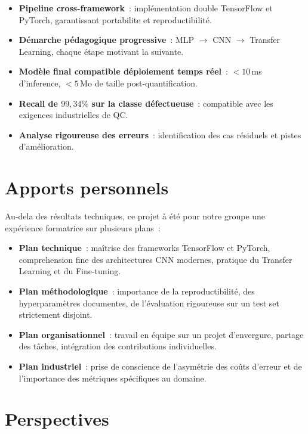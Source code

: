 \documentclass[12pt,a4paper,openany]{report}
\begin{document}
\begin{infobox}[title=Apports du projet]
\begin{itemize}
    \item \textbf{Pipeline cross-framework}~: implémentation double TensorFlow et PyTorch, garantissant portabilite et reproductibilité.
    \item \textbf{Démarche pédagogique progressive}~: MLP $\to$ CNN $\to$ Transfer Learning, chaque étape motivant la suivante.
    \item \textbf{Modèle final compatible déploiement temps réel}~: $<10$\,ms d'inference, $<5$\,Mo de taille post-quantification.
    \item \textbf{Recall de $99{,}34\%$ sur la classe défectueuse}~: compatible avec les exigences industrielles de QC.
    \item \textbf{Analyse rigoureuse des erreurs}~: identification des cas résiduels et pistes d'amélioration.
\end{itemize}
\end{infobox}

\section{Apports personnels}

Au-dela des résultats techniques, ce projet à été pour notre groupe une expérience formatrice sur plusieurs plans~:

\begin{itemize}
    \item \textbf{Plan technique}~: maîtrise des frameworks TensorFlow et PyTorch, comprehension fine des architectures CNN modernes, pratique du Transfer Learning et du Fine-tuning.
    \item \textbf{Plan méthodologique}~: importance de la reproductibilité, des hyperparamètres documentes, de l'évaluation rigoureuse sur un test set strictement disjoint.
    \item \textbf{Plan organisationnel}~: travail en équipe sur un projet d'envergure, partage des tâches, intégration des contributions individuelles.
    \item \textbf{Plan industriel}~: prise de conscience de l'asymétrie des coûts d'erreur et de l'importance des métriques spécifiques au domaine.
\end{itemize}

\section{Perspectives}
\end{document}
